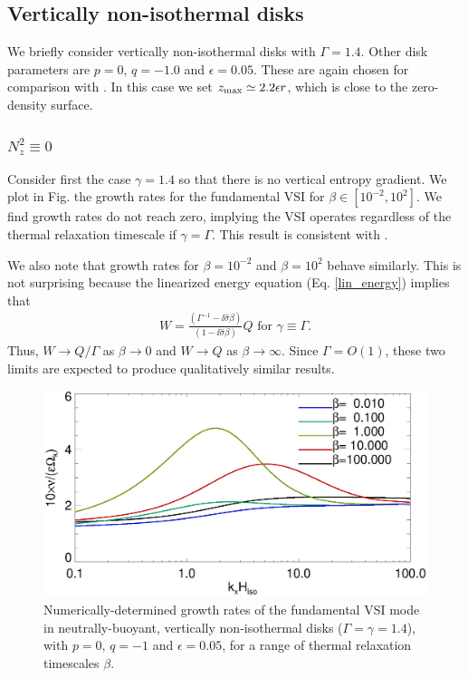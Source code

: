 
\subsection{Vertically non-isothermal disks}
We briefly consider vertically non-isothermal disks with
$\Gamma=1.4$. Other disk parameters are $p=0$, $q=-1.0$ and $\epsilon
= 0.05$. These are again chosen for comparison with \cite{nelson13}. 
In this case we set $z_\mathrm{max}\simeq2.2\epsilon r$, which is close to the
zero-density surface.     


\subsubsection{$N_z^2\equiv 0$}

Consider first the case $\gamma=1.4$ so that there is no vertical
entropy gradient. We plot in Fig. the growth rates for the
fundamental VSI for $\beta\in[10^{-2},10^{2}]$. We find growth rates
do not reach zero, implying the VSI operates regardless of the thermal
relaxation timescale if $\gamma=\Gamma$. This result is consistent
with \cite{nelson13}. 

We also note that growth rates for $\beta = 10^{-2}$ and
$\beta=10^{2}$ behave similarly. This is not surprising because
the linearized energy equation (Eq. \ref{lin_energy}) implies that 
\begin{align}
  W = \frac{\left(\Gamma^{-1} -
      \ii\hat{\sigma}\beta\right)}{\left(1-\ii\hat{\sigma}\beta\right)}
  Q \text{ for } \gamma\equiv \Gamma.   
\end{align}
Thus, $W \to Q/\Gamma$ as $\beta\to0$ and $W\to Q$ as
$\beta\to\infty$. Since $\Gamma=O(1)$, these two limits are expected
to produce qualitatively similar results.  

\begin{figure}
  \includegraphics[width=\linewidth,clip=true,trim=0cm 0cm 0cm
  0cm]{figures/growth_vnoniso1} 
  \caption{Numerically-determined growth rates of the fundamental VSI
    mode in neutrally-buoyant, vertically non-isothermal disks
    ($\Gamma=\gamma=1.4$), with $p=0$, $q=-1$ and  $\epsilon=0.05$, for
    a range of thermal relaxation timescales
    $\beta$. \label{growth_vnoniso1}}     
\end{figure} 

